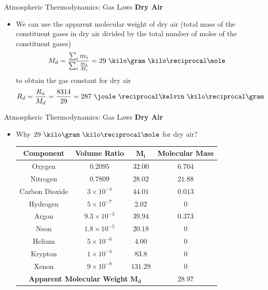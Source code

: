 \begin{frame}{Atmospheric Thermodynamics: Gas Laws}
\textbf{Dry Air}
\begin{itemize}
	\item We can use the apparent molecular weight of dry air (total mass of the constituent gases in dry air divided by the total number of moles of the constituent gases)
	$$M_d = \frac{\sum_i m_i}{\sum_i \frac{m_i}{M_i}} = 29\ \kilo\gram\ \kilo\reciprocal\mole$$
	to obtain the gas constant for dry air
	$$R_d = \frac{R_u}{M_d} = \frac{8314}{29} = 287\ \joule\ \reciprocal\kelvin\ \kilo\reciprocal\gram$$
\end{itemize}
\end{frame}
\begin{frame}{Atmospheric Thermodynamics: Gas Laws}
\textbf{Dry Air}
\begin{itemize}
	\item Why $29 \ \kilo\gram\ \kilo\reciprocal\mole$ for dry air?
	\begin{table}
	\begin{tabular}{c c c c}
	\hline\hline
	\textbf{Component} & \textbf{Volume Ratio} & $\mathbf{M_i}$ & \textbf{Molecular Mass}\\
	\hline
	Oxygen	& $0.2095$ & $32.00$	 & $6.704$\\
	Nitrogen & $0.7809$ & $28.02$ & $21.88$\\
	Carbon Dioxide & $3\times10^{-4}$ & $44.01$ & $0.013$\\
	Hydrogen & $5\times10^{-7}$	 & $2.02$	& $0$\\
	Argon & $9.3\times10^{-3}$ & $39.94$ & $0.373$\\
	Neon &	$1.8\times10^{-5}$ & $20.18$	 & $0$\\
	Helium & $5\times10^{-6}$ & $4.00$	 & $0$\\
	Krypton	& $1\times10^{-4}$ & $83.8$ & $0$\\
	Xenon & $9\times10^{-8}$ & $131.29$ & $0$\\
	\hline
	\multicolumn{3}{c}{\textbf{Apparent Molecular Weight} $\mathbf{M_d}$} & $\mathbf{28.97}$\\
	\hline\hline
	\end{tabular}	
	\end{table}

\end{itemize}
\end{frame}
